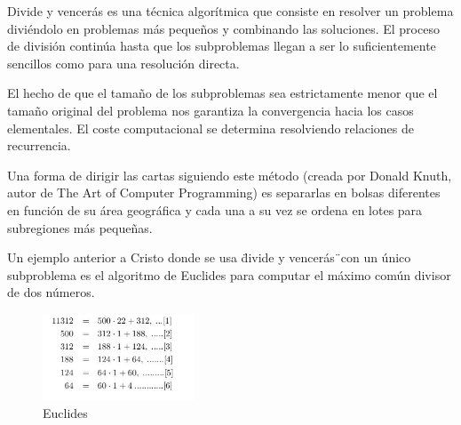 
Divide y vencer\'as es una t\'ecnica algor\'itmica que consiste en resolver un problema divi\'endolo en problemas m\'as pequeños y combinando las soluciones. 
El proceso de divisi\'on contin\'ua hasta que los subproblemas llegan a ser lo suficientemente sencillos como para una resoluci\'on directa.

El hecho de que el tamaño de los subproblemas sea estrictamente menor que el tamaño original del problema nos garantiza la convergencia hacia los casos elementales.
El coste computacional se determina resolviendo relaciones de recurrencia.

Una forma de dirigir las cartas siguiendo este m\'etodo (creada por Donald Knuth, autor de The Art of Computer Programming) es separarlas en bolsas diferentes en funci\'on de su \'area geogr\'afica y cada una a su vez se ordena en lotes para subregiones más pequeñas.
 
Un ejemplo anterior a Cristo donde se usa \"divide y vencerás\" \ con un \'unico subproblema es el algoritmo de Euclides para computar el máximo com\'un divisor de dos n\'umeros.
 
\begin{figure}[htb] 
\centering
	\includegraphics[width=0.40\textwidth]{./Imagenes/euclides.jpg}
	\caption{Euclides} 
	\label{fig:euclides} 
\end{figure}